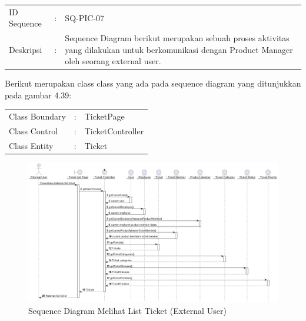 \documentclass[12pt]{article}
\begin{document}
\begin{enumerate}[label=\textbf{4.\arabic*.}]
\begin{enumerate} [label=\textbf{4.2.\arabic*.}, wide, labelwidth=!, labelindent=0pt]
\begin{enumerate}[label=\textbf{4.2.2.\arabic*.}, wide, labelwidth=!, labelindent=0pt]
\begin{enumerate}[label=\arabic*.]
                \begin{tabularx}{.9\linewidth}{@{} l l X @{}}
                    ID Sequence &	: & SQ-PIC-07 \\
                    Deskripsi &	: & Sequence Diagram berikut merupakan sebuah proses aktivitas yang dilakukan untuk berkomunikasi dengan Product Manager oleh seorang external user. 
        
                \end{tabularx}

                \noindent Berikut merupakan class class yang ada pada sequence diagram yang ditunjukkan pada gambar 4.39:

                \begin{tabularx}{.9\linewidth}{@{} l l X @{}}
                    Class Boundary & : & TicketPage \\
                    Class Control & : & TicketController \\
                    Class Entity & : & Ticket
                
                \end{tabularx}




                
                
                \begin{figure}
                    \centering \includegraphics[width=\textwidth]{out/plantuml/sequence/ex/ex1/Melihat List Ticket.png}
                    \caption{Sequence Diagram Melihat List Ticket (External User)}
                    \label{fig:SQ-PIC-01}
                \end{figure}


\end{enumerate}
\end{enumerate}
\end{enumerate}
\end{enumerate}
\end{document}

